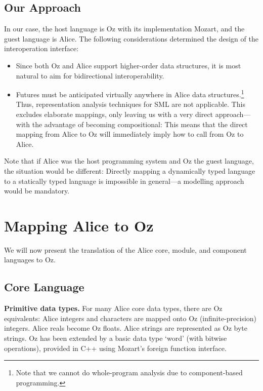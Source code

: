 \documentclass{entcs}
\begin{document}
\subsection{Our Approach}

In our case, the host language is Oz with its implementation Mozart, and the
guest language is Alice.  The following considerations determined the design
of the interoperation interface:
\begin{itemize}
\item Since both Oz and Alice support higher-order data structures, it is
  most natural to aim for bidirectional interoperability.
\item Futures must be anticipated virtually anywhere in Alice data
  structures.\footnote{Note that we cannot do whole-program analysis due to
  component-based programming.}  Thus, representation analysis techniques
  for SML are not applicable.  This excludes elaborate mappings, only
  leaving us with a very direct approach---with the advantage of becoming
  compositional:  This means that the direct mapping from Alice to Oz will
  immediately imply how to call from Oz to Alice.
\end{itemize}

\noindent Note that if Alice was the host programming system and Oz the
guest language, the situation would be different:  Directly mapping a
dynamically typed language to a statically typed language is impossible
in general---a modelling approach would be mandatory.


\section{Mapping Alice to Oz}\label{mapping}

We will now present the translation of the Alice core, module, and
component languages to Oz.

\subsection{Core Language}

{\bfseries Primitive data types.}
For many Alice core data types, there are Oz equivalents:  Alice integers
and characters are mapped onto Oz (infinite-precision) integers.  Alice reals
become Oz floats.  Alice strings are represented as Oz byte strings.  Oz
has been extended by a basic data type `word' (with bitwise operations),
provided in C++ using Mozart's foreign function interface.
\end{document}

